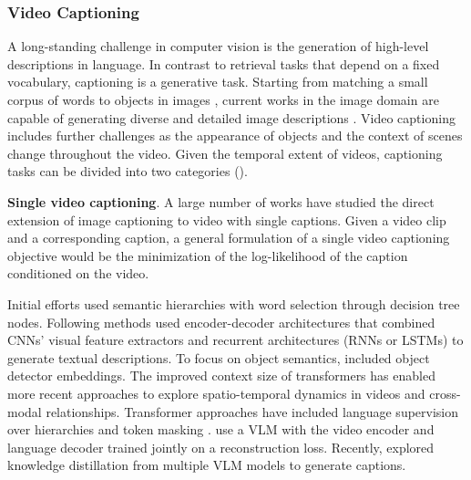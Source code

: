 \subsubsection{Video Captioning} 

A long-standing challenge in computer vision is the generation of high-level descriptions in language. In contrast to retrieval tasks that depend on a fixed vocabulary, captioning is a generative task. Starting from matching a small corpus of words to objects in images \citep{barnard2001learning,barnard2003matching}, current works in the image domain are capable of generating diverse and detailed image descriptions \citep{mokady2021clipcap,alayrac2022flamingo}. Video captioning includes further challenges as the appearance of objects and the context of scenes change throughout the video. Given the temporal extent of videos, captioning tasks can be divided into two categories ().

\noindent
\textbf{Single video captioning}. A large number of works have studied the direct extension of image captioning to video with single captions.  
Given a video clip and a corresponding caption, a general formulation of a single video captioning objective would be the minimization of the log-likelihood of the caption conditioned on the video.



Initial efforts \citep{guadarrama2013youtube2text} used semantic hierarchies with word selection through decision tree nodes. Following methods \citep{aafaq2019spatio,chen2017generating,gan2017semantic,pan2017video,wang2018reconstruction} used encoder-decoder architectures that combined CNNs' visual feature extractors and recurrent architectures (RNNs or LSTMs) to generate textual descriptions. To focus on object semantics, \citet{aafaq2019spatio,zheng2020syntax} included object detector embeddings. The improved context size of transformers has enabled more recent approaches to explore spatio-temporal dynamics in videos and cross-modal relationships. Transformer approaches have included language supervision over hierarchies \citep{ye2022hierarchical} and token masking \citep{lin2022swinbert,shen2023accurate,yan2023prompt}. \citet{seo2022end} use a VLM with the video encoder and language decoder trained jointly on a reconstruction loss. Recently, \citet{chen2024panda} explored knowledge distillation from multiple VLM models to generate captions.


